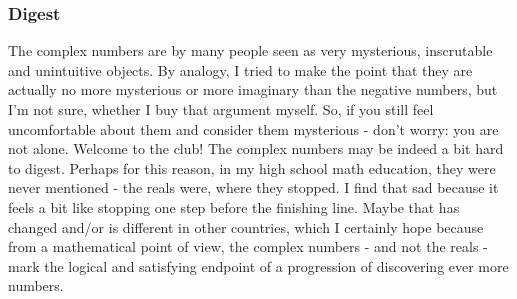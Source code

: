 



\subsubsection{Digest}
The complex numbers are by many people seen as very mysterious, inscrutable and unintuitive objects. By analogy, I tried to make the point that they are actually no more mysterious or more imaginary than the negative numbers, but I'm not sure, whether I buy that argument myself. So, if you still feel uncomfortable about them and consider them mysterious - don't worry: you are not alone. Welcome to the club! The complex numbers may be indeed a bit hard to digest. Perhaps for this reason, in my high school math education, they were never mentioned - the reals were, where they stopped. I find that sad because it feels a bit like stopping one step before the finishing line. Maybe that has changed and/or is different in other countries, which I certainly hope because from a mathematical point of view, the complex numbers - and not the reals - mark the logical and satisfying endpoint of a progression of discovering ever more numbers.

